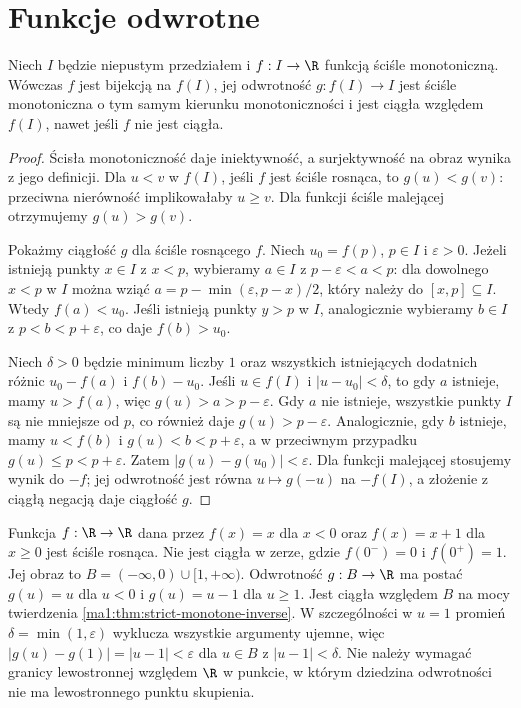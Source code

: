 \section{Funkcje odwrotne}
\begin{twierdzenie}
\label{ma1:thm:strict-monotone-inverse}
Niech $I$ będzie niepustym przedziałem i $f:I\to\R$ funkcją ściśle monotoniczną. Wówczas $f$ jest bijekcją na $f(I)$, jej odwrotność $g:f(I)\to I$ jest ściśle monotoniczna o tym samym kierunku monotoniczności i jest ciągła względem $f(I)$, nawet jeśli $f$ nie jest ciągła.
\end{twierdzenie}
\begin{proof}
Ścisła monotoniczność daje iniektywność, a surjektywność na obraz wynika z jego definicji. Dla $u<v$ w $f(I)$, jeśli $f$ jest ściśle rosnąca, to $g(u)<g(v)$: przeciwna nierówność implikowałaby $u\ge v$. Dla funkcji ściśle malejącej otrzymujemy $g(u)>g(v)$.

Pokażmy ciągłość $g$ dla ściśle rosnącego $f$. Niech $u_0=f(p)$, $p\in I$ i $\varepsilon>0$. Jeżeli istnieją punkty $x\in I$ z $x<p$, wybieramy $a\in I$ z $p-\varepsilon<a<p$: dla dowolnego $x<p$ w $I$ można wziąć $a=p-\min(\varepsilon,p-x)/2$, który należy do $[x,p]\subseteq I$. Wtedy $f(a)<u_0$. Jeśli istnieją punkty $y>p$ w $I$, analogicznie wybieramy $b\in I$ z $p<b<p+\varepsilon$, co daje $f(b)>u_0$.

Niech $\delta>0$ będzie minimum liczby $1$ oraz wszystkich istniejących dodatnich różnic $u_0-f(a)$ i $f(b)-u_0$. Jeśli $u\in f(I)$ i $|u-u_0|<\delta$, to gdy $a$ istnieje, mamy $u>f(a)$, więc $g(u)>a>p-\varepsilon$. Gdy $a$ nie istnieje, wszystkie punkty $I$ są nie mniejsze od $p$, co również daje $g(u)>p-\varepsilon$. Analogicznie, gdy $b$ istnieje, mamy $u<f(b)$ i $g(u)<b<p+\varepsilon$, a w przeciwnym przypadku $g(u)\le p<p+\varepsilon$. Zatem $|g(u)-g(u_0)|<\varepsilon$. Dla funkcji malejącej stosujemy wynik do $-f$; jej odwrotność jest równa $u\mapsto g(-u)$ na $-f(I)$, a złożenie z ciągłą negacją daje ciągłość $g$.
\end{proof}

\begin{przyklad}
\label{ma1:ex:inverse-of-jump}
Funkcja $f:\R\to\R$ dana przez $f(x)=x$ dla $x<0$ oraz $f(x)=x+1$ dla $x\ge0$ jest ściśle rosnąca. Nie jest ciągła w zerze, gdzie $f(0^-)=0$ i $f(0^+)=1$. Jej obraz to $B=(-\infty,0)\cup[1,+\infty)$. Odwrotność $g:B\to\R$ ma postać $g(u)=u$ dla $u<0$ i $g(u)=u-1$ dla $u\ge1$. Jest ciągła względem $B$ na mocy twierdzenia \ref{ma1:thm:strict-monotone-inverse}. W szczególności w $u=1$ promień $\delta=\min(1,\varepsilon)$ wyklucza wszystkie argumenty ujemne, więc $|g(u)-g(1)|=|u-1|<\varepsilon$ dla $u\in B$ z $|u-1|<\delta$. Nie należy wymagać granicy lewostronnej względem $\R$ w punkcie, w którym dziedzina odwrotności nie ma lewostronnego punktu skupienia.
\end{przyklad}

